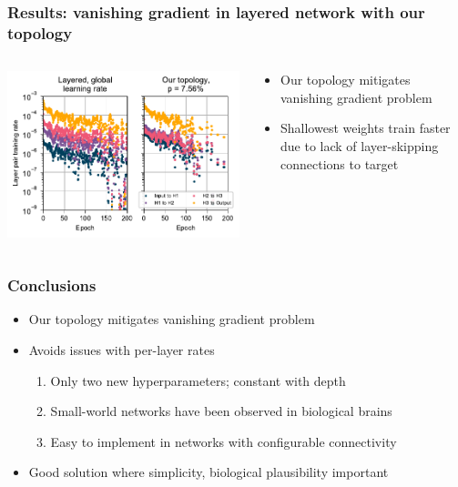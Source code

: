 \documentclass[pdf]{beamer}
\begin{document}
\begin{frame}
	\frametitle{Results: vanishing gradient in layered network with our topology}
	\begin{columns}
	\begin{column}{.6\textwidth}
		\includegraphics[width=\textwidth]{figures/perlayer_global+ours.pdf}
	\end{column}
	\begin{column}{.4\textwidth}
		\begin{itemize}
			\item<1-> Our topology mitigates vanishing gradient problem
			\item<2-> Shallowest weights train faster due to lack of layer-skipping connections to target
		\end{itemize}
	\end{column}
	\end{columns}
\end{frame}

\begin{frame}
	\frametitle{Conclusions}
	\begin{itemize}
		\item<1-> Our topology mitigates vanishing gradient problem
		\item<2-> Avoids issues with per-layer rates
		\begin{enumerate}
			\item<3-> Only two new hyperparameters; constant with depth
			\item<4-> Small-world networks have been observed in biological brains
			\item<5-> Easy to implement in networks with configurable connectivity
		\end{enumerate}
		\item<6-> Good solution where simplicity, biological plausibility important
	\end{itemize}
\end{frame}
\end{document}
